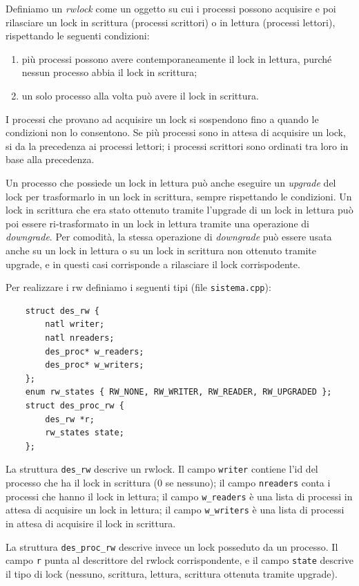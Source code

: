 Definiamo un {\em rwlock} come un oggetto su cui i processi possono acquisire e poi rilasciare un lock
in scrittura (processi scrittori) o in lettura (processi lettori), rispettando le seguenti condizioni:
\begin{enumerate}
  \item pi\`u processi possono avere contemporaneamente il lock in lettura, purch\'e nessun processo abbia il lock in scrittura;
\item un solo processo alla volta pu\`o avere il lock in scrittura.
\end{enumerate}
I processi che provano ad acquisire un lock si sospendono fino a quando le condizioni non lo
consentono. Se pi\`u processi sono in attesa di acquisire un lock, si da la precedenza
ai processi lettori; i processi scrittori sono ordinati tra loro in base alla precedenza.

Un processo che possiede un lock in lettura pu\`o anche eseguire un {\em upgrade} del lock
per trasformarlo in un lock in scrittura, sempre rispettando le condizioni.
Un lock in scrittura che era stato ottenuto tramite l'upgrade di un lock in lettura pu\`o
poi essere ri-trasformato in un lock in lettura tramite una operazione di {\em downgrade}.
Per comodit\`a, la stessa operazione di {\em downgrade} pu\`o essere usata anche su un lock
in lettura o su un lock in scrittura non ottenuto tramite upgrade,
e in questi casi corrisponde a rilasciare il lock corrispodente.

Per realizzare i rw definiamo i seguenti tipi (file {\tt sistema.cpp}):
\begin{verbatim}
    struct des_rw {
        natl writer;
        natl nreaders;
        des_proc* w_readers;
        des_proc* w_writers;
    };
    enum rw_states { RW_NONE, RW_WRITER, RW_READER, RW_UPGRADED };
    struct des_proc_rw {
        des_rw *r;
        rw_states state;
    };
\end{verbatim}
La struttura \verb|des_rw| descrive un rwlock. Il campo \verb|writer| contiene
l'id del processo che ha il lock in scrittura (0 se nessuno);
il campo \verb|nreaders| conta i processi che hanno il lock in lettura;
il campo \verb|w_readers| \`e una lista di processi in attesa di acquisire un lock
in lettura; il campo \verb|w_writers| \`e una lista di processi in attesa di
acquisire il lock in scrittura.

La struttura \verb|des_proc_rw| descrive invece un lock posseduto da un processo.
Il campo \verb|r| punta al descrittore del rwlock corrispondente, e il campo
\verb|state| descrive il tipo di lock (nessuno, scrittura, lettura,
scrittura ottenuta tramite upgrade).

